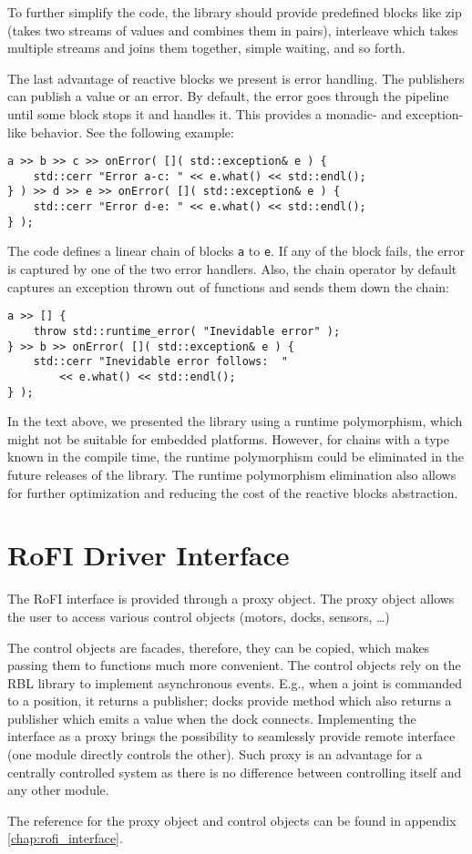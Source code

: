 To further simplify the code, the library should provide predefined blocks like
zip (takes two streams of values and combines them in pairs), interleave which
takes multiple streams and joins them together, simple waiting, and so forth.

The last advantage of reactive blocks we present is error handling. The
publishers can publish a value or an error. By default, the error goes through the
pipeline until some block stops it and handles it. This provides a monadic- and
exception-like behavior. See the following example:
\begin{verbatim}
a >> b >> c >> onError( []( std::exception& e ) {
    std::cerr "Error a-c: " << e.what() << std::endl();
} ) >> d >> e >> onError( []( std::exception& e ) {
    std::cerr "Error d-e: " << e.what() << std::endl();
} );
\end{verbatim}
The code defines a linear chain of blocks \texttt{a} to \texttt{e}. If any of
the block fails, the error is captured by one of the two error handlers. Also,
the chain operator by default captures an exception thrown out of functions and
sends them down the chain:
\begin{verbatim}
a >> [] {
    throw std::runtime_error( "Inevidable error" );
} >> b >> onError( []( std::exception& e ) {
    std::cerr "Inevidable error follows:  "
        << e.what() << std::endl();
} );
\end{verbatim}

In the text above, we presented the library using a runtime polymorphism, which
might not be suitable for embedded platforms. However, for chains with a type
known in the compile time, the runtime polymorphism could be eliminated in the
future releases of the library. The runtime polymorphism elimination also allows
for further optimization and reducing the cost of the reactive blocks
abstraction.

\section{RoFI Driver Interface}

The RoFI interface is provided through a proxy object. The proxy object allows
the user to access various control objects (motors, docks, sensors, \ldots)

The control objects are facades, therefore, they can be copied, which makes
passing them to functions much more convenient. The control objects rely on the
RBL library to implement asynchronous events. E.g., when a joint is commanded to
a position, it returns a publisher; docks provide method  which
also returns a publisher which emits a value when the dock connects.
Implementing the interface as a proxy brings the possibility to seamlessly
provide remote interface (one module directly controls the other). Such proxy
is an advantage for a centrally controlled system as there is no difference
between controlling itself and any other module.

The reference for the proxy object and control objects can be found in appendix
\ref{chap:rofi_interface}.